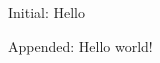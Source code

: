 \def\addtomacro#1#2{\expandafter\def\expandafter#1\expandafter{#1#2}}
\def\foo{Hello}
Initial: \foo

\addtomacro\foo{ world!}
Appended: \foo
\bye
